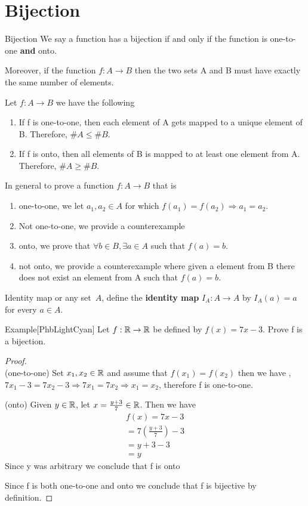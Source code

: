 \documentclass[../MATH-2000-Notes.tex]{subfiles}
\begin{document}
\section{Bijection}
\begin{Definition}
    {Bijection}
    We say a function has a bijection if and only if the function is one-to-one \textbf{and} onto.

    Moreover, if the function \(f: A \rightarrow B\) then the two sets A and B must have exactly the same number of elements.
\end{Definition}
\begin{Note}
    Let \(f: A \rightarrow B\) we have the following
    \begin{enumerate}
        \item If f is one-to-one, then each element of A gets mapped to a unique element of B. Therefore, \(\#A \leq \#B\).
        \item If f is onto, then all elements of B is mapped to at least one element from A. Therefore, \(\#A \geq \#B\).
    \end{enumerate}
\end{Note}
In general to prove a function \(f: A\rightarrow B\) that is
\begin{enumerate}
    \item one-to-one, we let \(a_1,a_2 \in A\) for which \(f(a_1) = f(a_2) \Rightarrow a_1 = a_2\).
    \item Not one-to-one, we provide a counterexample
    \item onto, we prove that \(\forall b \in B, \exists a \in A\) such that \(f(a) = b\).
    \item not onto, we provide a counterexample where given a element from B there does not exist an element from A such that \(f(a) = b\).
\end{enumerate}
\begin{Definition}
    {Identity map}
    or any set~$A$, define the \textbf{identity map} $I_A \colon A \to A$ by $I_A(a) = a$ for every $a \in A$.
\end{Definition}
\begin{commentbox}{Example}[{PhbLightCyan}]
    Let \(f: \mathbb{R} \rightarrow \mathbb{R}\) be defined by \(f(x) = 7x - 3\). Prove f is a bijection.
\end{commentbox}
\begin{proof}~\\
    (one-to-one) Set \(x_1,x_2 \in \mathbb{R}\) and assume that \(f(x_1) = f(x_2)\) then we have , \(7x_1 - 3 = 7x_2 - 3 \Rightarrow 7x_1 = 7x_2 \Rightarrow x_1 = x_2\), therefore f is one-to-one.

    (onto) Given \(y \in \mathbb{R}\), let \(x = \frac{y + 3}{7} \in \mathbb{R}\). Then we have
    \begin{gather*}
        f(x) = 7x-3\\
        = 7 \left( \frac{y + 3}{7} \right)-3\\
        = y + 3 - 3\\
        = y
    \end{gather*}
    Since y was arbitrary we conclude that f is onto

    Since f is both one-to-one and onto we conclude that f is bijective by definition.
\end{proof}
\end{document}
